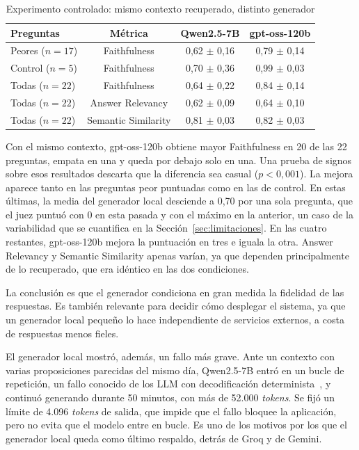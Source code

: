 \documentclass[11pt, a4paper]{report}
\begin{document}
	\begin{table}[H]
		\centering
		\begin{tabular}{|l|c|c|c|}
			\hline
			\rowcolor{tabla-header}
			\textbf{Preguntas} & \textbf{Métrica} & \textbf{Qwen2.5-7B} & \textbf{gpt-oss-120b} \\
			\hline
			Peores ($n=17$) & Faithfulness & 0,62 $\pm$ 0,16 & 0,79 $\pm$ 0,14 \\
			\hline
			\rowcolor{fila-alterna}
			Control ($n=5$) & Faithfulness & 0,70 $\pm$ 0,36 & 0,99 $\pm$ 0,03 \\
			\hline
			Todas ($n=22$) & Faithfulness & 0,64 $\pm$ 0,22 & 0,84 $\pm$ 0,14 \\
			\hline
			\rowcolor{fila-alterna}
			Todas ($n=22$) & Answer Relevancy & 0,62 $\pm$ 0,09 & 0,64 $\pm$ 0,10 \\
			\hline
			Todas ($n=22$) & Semantic Similarity & 0,81 $\pm$ 0,03 & 0,82 $\pm$ 0,03 \\
			\hline
		\end{tabular}
		\caption{Experimento controlado: mismo contexto recuperado, distinto generador}
		\label{tab:ragas-generador}
	\end{table}

	Con el mismo contexto, gpt-oss-120b obtiene mayor Faithfulness en 20 de las 22
	preguntas, empata en una y queda por debajo solo en una. Una prueba de signos
	sobre esos resultados descarta que la diferencia sea casual ($p < 0{,}001$).
	La mejora aparece tanto en las preguntas peor puntuadas como en las de
	control. En estas últimas, la media del generador local desciende a 0,70 por
	una sola pregunta, que el juez puntuó con 0 en esta pasada y con el máximo en
	la anterior, un caso de la variabilidad que se cuantifica en la
	Sección~\ref{sec:limitaciones}. En las cuatro restantes, gpt-oss-120b mejora
	la puntuación en tres e iguala la otra. Answer Relevancy y Semantic Similarity
	apenas varían, ya que dependen principalmente de lo recuperado, que era idéntico
	en las dos condiciones.

	La conclusión es que el generador condiciona en gran medida la fidelidad
	de las respuestas. Es también
	relevante para decidir cómo desplegar el sistema, ya que un generador local pequeño
	lo hace independiente de servicios externos, a costa de respuestas menos
	fieles.

	El generador local mostró, además, un fallo más grave. Ante un contexto con
	varias proposiciones parecidas del mismo día, Qwen2.5-7B entró en un bucle de
	repetición, un fallo conocido de los LLM con decodificación
	determinista~\cite{holtzman2020-degeneration}, y continuó generando durante 50
	minutos, con más de 52.000 \textit{tokens}. Se fijó un límite de 4.096
	\textit{tokens} de salida, que impide que el fallo bloquee la aplicación, pero
	no evita que el modelo entre en bucle. Es uno de los motivos por los que el
	generador local queda como último respaldo, detrás de Groq y de Gemini.
\end{document}
